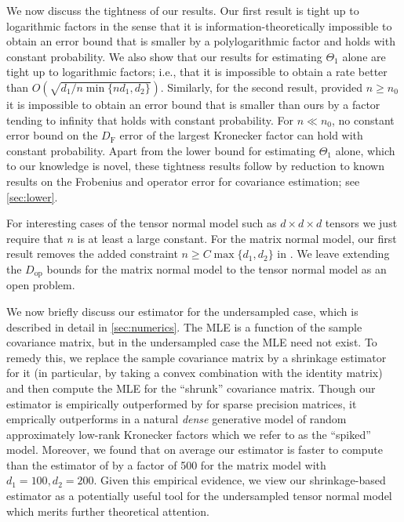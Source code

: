 \documentclass[aos]{imsart}
\theoremstyle{definition}
\numberwithin{equation}{section}
\newcommand{\DF}{D_{\operatorname{F}}}
\newcommand{\Dop}{D_{\operatorname{op}}}
\newcommand{\MW}[1]{{\color{red}[MW: #1]}}
\newcommand{\MW}[1]{{}}
\begin{document}
We now discuss the tightness of our results.
Our first result is tight up to logarithmic factors in the sense that it is information-theoretically impossible to obtain an error bound that is smaller by a polylogarithmic factor and holds with constant probability.
We also show that our results for estimating $\Theta_1$ alone are tight up to logarithmic factors; i.e., that it is impossible to obtain a rate better than $O(\sqrt{d_1/ n \min\{n d_1, d_2\}})$. Similarly, for the second result, provided $n \geq n_0$ it is impossible to obtain an error bound that is smaller than ours by a factor tending to infinity that holds with constant probability. For $n \ll n_0$, no constant error bound on the $\DF$ error of the largest Kronecker factor can hold with constant probability. Apart from the lower bound for estimating $\Theta_1$ alone, which to our knowledge is novel, these tightness results follow by reduction to known results on the Frobenius and operator error for covariance estimation; see \cref{sec:lower}.

For interesting cases of the tensor normal model such as $d\times d \times d$ tensors we just require that $n$ is at least a large constant.
For the matrix normal model, our first result removes the added constraint $n \geq C \max\{d_1,d_2\}$ in \cite{tsiligkaridis2013convergence}.
We leave extending the $\Dop$ bounds for the matrix normal model to the tensor normal model as an open problem.

We now briefly discuss our estimator for the undersampled case, which is described in detail in \cref{sec:numerics}. The MLE is a function of the sample covariance matrix, but in the undersampled case the MLE need not exist. To remedy this, we replace the sample covariance matrix by a shrinkage estimator for it (in particular, by taking a convex combination with the identity matrix) and then compute the MLE for the ``shrunk'' covariance matrix. Though our estimator is empirically outperformed by \cite{zhou2014gemini} for sparse precision matrices, it emprically outperforms \cite{zhou2014gemini} in a natural \emph{dense} generative model of random approximately low-rank Kronecker factors which we refer to as the ``spiked'' model. Moreover, we found that on average our estimator is faster to compute than the estimator of \cite{zhou2014gemini} by a factor of 500 for the matrix model with $d_1 = 100, d_2 = 200$. Given this empirical evidence, we view our shrinkage-based estimator as a potentially useful tool for the undersampled tensor normal model which merits further theoretical attention.
\end{document}

